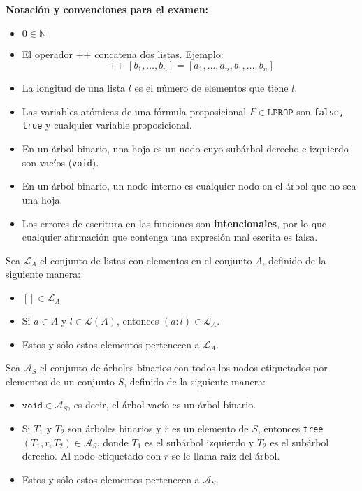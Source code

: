 \documentclass[12pt, a4paper]{exam}
\begin{document}
    \textbf{Notación y convenciones para el examen:}
    {\tiny
    \begin{multicols}{2}
    \begin{itemize}\setlength\itemsep{0em}  
      \item $0\in\mathbb{N}$
      \item El operador $\texttt{++}$ concatena dos listas. Ejemplo: 
      \begin{equation*}
        [a_1, \ldots, a_n] \texttt{ ++ } [b_1, \ldots, b_n] = 
        [a_1, \ldots, a_n, b_1, \ldots, b_n]
      \end{equation*}

      \item La longitud de una lista $l$ es el número de elementos que tiene 
      $l$. 
      
      \item Las variables atómicas de una fórmula proposicional $F \in 
      \texttt{LPROP}$ son \texttt{false, true} y cualquier variable 
      proposicional. 

      \item En un árbol binario, una hoja es un nodo cuyo subárbol derecho e 
      izquierdo son vacíos (\texttt{void}). 

      \item En un árbol binario, un nodo interno es cualquier nodo en el árbol 
      que no sea una hoja. 

      \item Los errores de escritura en las funciones son {\bf intencionales}, 
      por lo que cualquier afirmación que contenga una expresión mal escrita 
      es falsa.
    \end{itemize}

    Sea $\mathcal{L}_A$ el conjunto de listas con elementos en el conjunto $A$, 
    definido de la siguiente manera: 
    \begin{itemize}
        \item $[] \in \mathcal{L}_A$
        \item Si $a \in A$ y $l \in \mathcal{L}(A)$, entonces $(a:l) \in 
        \mathcal{L}_A$. 
        \item Estos y sólo estos elementos pertenecen a $\mathcal{L}_A$.  
    \end{itemize}

    \columnbreak

    Sea $\mathcal{A}_S$ el conjunto de árboles binarios con todos los nodos 
    etiquetados por elementos de un conjunto $S$, definido de la siguiente 
    manera:
    \begin{itemize}
        \item $\texttt{void} \in \mathcal{A}_S$, es decir, el árbol vacío 
        es un árbol binario. 
        \item Si $T_1$ y $T_2$ son árboles binarios y $r$ es un elemento 
        de $S$, entonces \texttt{tree}$(T_1, r, T_2) \in \mathcal{A}_S$, 
        donde $T_1$ es el subárbol izquierdo y $T_2$ es el subárbol derecho.
        Al nodo etiquetado con $r$ se le llama raíz del árbol. 
        \item Estos y sólo estos elementos pertenecen a $\mathcal{A}_S$. 
    \end{itemize}


\end{multicols}}
\end{document}
